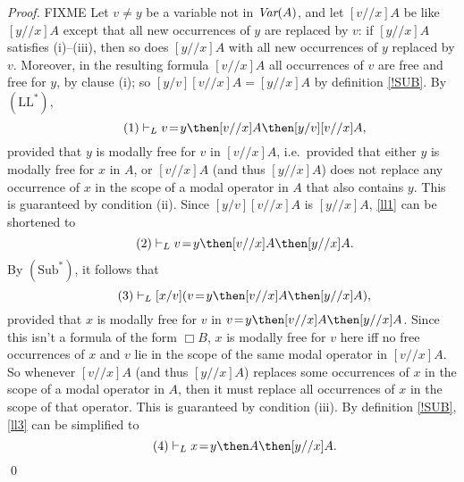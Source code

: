 \documentclass[11pt]{woarticle}
\newcommand{\cmnt}[1]{\iffalse #1 \fi}
\theoremstyle{break}
\theoremstyle{nonumberplain}
\newcommand{\1}{\;\,|\;\,}
\newcommand{\var}{\emph{Var}}
\newcommand{\T}[1]{\ensuremath{(\mathrm{ #1})}}
\begin{document}
\begin{proof}
  FIXME
  Let $v \not= y$ be a variable not in $\var(A)$, and let $[v//x]A$ be
  like $[y//x]A$ except that all new occurrences of $y$ are replaced
  by $v$: if $[y//x]A$ satisfies (i)--(iii), then so does $[y//x]A$
  with all new occurrences of $y$ replaced by $v$. Moreover, in the
  resulting formula $[v//x]A$ all occurrences of $v$ are free and free
  for $y$, by clause (i); so $[y/v][v//x]A = [y//x]A$ by definition
  \ref{!SUB}. By \T{LL^*},
  \begin{equation}\tag{1}\label{ll1}
    \vdash_L v\!=\!y \then [v//x]A \then [y/v][v//x]A,
  \end{equation}
  provided that $y$ is modally free for $v$ in $[v//x]A$, i.e.\
  provided that either $y$ is modally free for $x$ in $A$, or
  $[v//x]A$ (and thus $[y//x]A$) does not replace any occurrence of
  $x$ in the scope of a modal operator in $A$ that also contains $y$.%
  \cmnt{ %
    (The first clause is not redundant because $A$ can be a box
    formula that contains $x$ and $y$; in this case it is OK to
    replace $x$.)%
  } %
  This is guaranteed by condition (ii). Since $[y/v][v//x]A$ is
  $[y//x]A$, \eqref{ll1} can be shortened to
  \begin{equation}\tag{2}\label{ll2}
    \vdash_L v\!=\!y \then [v//x]A \then [y//x]A.
  \end{equation}
  By \T{Sub^*}, it follows that
  \begin{equation}\tag{3}\label{ll3}
    \vdash_L [x/v](v\!=\!y \then [v//x]A \then [y//x]A),
  \end{equation}
  provided that $x$ is modally free for $v$ in $v\!=\!y \then [v//x]A
  \then [y//x]A$. Since this isn't a formula of the form $\Box B$, $x$
  is modally free for $v$ here iff no free occurrences of $x$ and $v$
  lie in the scope of the same modal operator in $[v//x]A$. So
  whenever $[v//x]A$ (and thus $[y//x]A$) replaces some occurrences of
  $x$ in the scope of a modal operator in $A$, then it must replace
  all occurrences of $x$ in the scope of that operator. %
  \cmnt{%
    (It is not enough that $x$ is modally free for $v$ in $[v//x]A$:
    consider $x\!=\!y \then \Box x\!=\!x \then \Box x\!=\!y$, which
    the application of \T{Sub^*} would derive from $x\!=\!v \then \Box
    x\!=\!v \then \Box x\!=\!y$.)%
  } %
  This is guaranteed by condition (iii). By definition \ref{!SUB},
  \eqref{ll3} can be simplified to
  \begin{equation}\tag{4}
    \vdash_L x\!=\!y \then A \then [y//x]A. 
  \end{equation}
  \qed
\end{proof}
\end{document}
